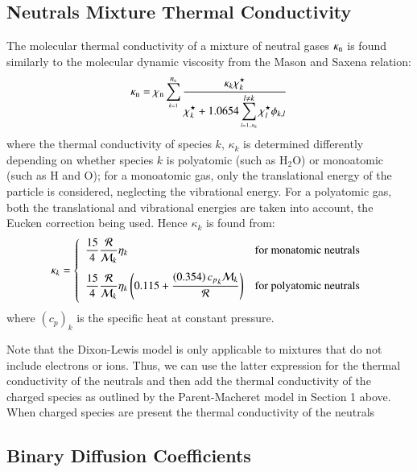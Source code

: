 \documentclass{warpdoc}
\newcommand{\alb}{\vspace{0.1cm}\\} %
\newcommand{\cp}{{c_p}}
\newcommand{\ns}{{{n}_{\rm s}}}
\newcommand{\mfa}{\scriptscriptstyle}
\newcommand{\mfd}{\displaystyle}
\begin{document}
 
\subsection{Neutrals Mixture Thermal Conductivity}

The molecular thermal conductivity of a mixture of neutral gases $\kappa_{\rm n}$ is found similarly to the molecular dynamic viscosity from the Mason and Saxena \cite{gen:mason-saxena} relation:
%
\begin{equation}
\kappa_{\rm n}= \chi_{\rm n} \mfd\sum_{\mfa k=1}^{\ns}  \mfd \frac{\mfd\kappa_k \chi_k^\star}
                     {\mfd \chi_k^\star + \mfd 1.0654
                          \mfd\sum_{\mfa l=1..\ns}^{l \neq k}  {\chi}_l^\star \phi_{k,l}}
\label{eqn:moltherm-mixture}
\end{equation}
%
where the thermal conductivity of species $k$, $\kappa_k$ is determined
differently depending on whether
species $k$ is polyatomic (such as H$_2$O) or monoatomic
(such as H and O); for a monoatomic gas, only the
translational energy of the particle is considered,
neglecting the vibrational energy. For a polyatomic gas,
both the translational and vibrational energies are taken into
account, the Eucken correction being used. Hence $\kappa_k$
is found from:
%
\begin{equation}
\kappa_k = \left\{ \begin{array}{ll}
\vspace{0.2cm}
\mfd\frac{15}{4} \mfd\frac{\cal R}{{\cal M}_k} \eta_k & {\rm for~monatomic~neutrals} \alb
\mfd\frac{15}{4} \mfd\frac{\cal R}{{\cal M}_k} \eta_k \left(  0.115 +
   \mfd\frac{ \left( 0.354 \right) {\cp}_k{\cal M}_k}{\cal R}  \right)
        & {\rm for~polyatomic~neutrals} \alb
\end{array}
\right.
\label{eqn:moltherm-kappa}
\end{equation}
%
where $(c_p)_k$ is the specific heat at constant pressure.

Note that the Dixon-Lewis model is only applicable to mixtures that do not include electrons or ions. Thus, we can use the latter expression for the thermal conductivity of the neutrals and then add the thermal conductivity of the charged species as outlined by the Parent-Macheret model in Section 1 above. When charged species are present the thermal conductivity of the neutrals 


\subsection{Binary Diffusion Coefficients}
\end{document}

